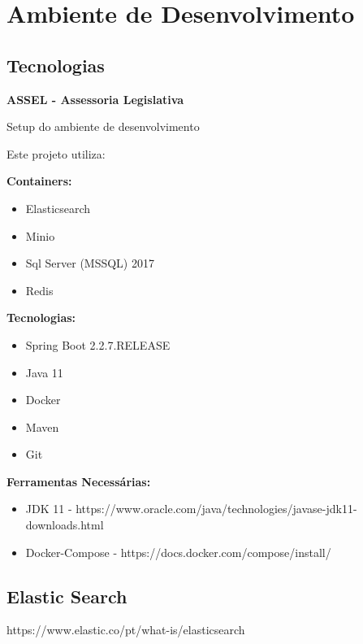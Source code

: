 \chapter{Ambiente de Desenvolvimento}

\section{Tecnologias}

\textbf{ASSEL - Assessoria Legislativa}

Setup do ambiente de desenvolvimento

Este projeto utiliza:

\textbf{Containers:}

\begin{itemize}
	\item Elasticsearch
	\item Minio
	\item Sql Server (MSSQL) 2017
	\item Redis
\end{itemize}



\textbf{Tecnologias:}

\begin{itemize}
	\item Spring Boot 2.2.7.RELEASE
	\item Java 11
	\item Docker
	\item Maven
	\item Git
\end{itemize}


\textbf{Ferramentas Necessárias:}

\begin{itemize}
	\item JDK 11 - https://www.oracle.com/java/technologies/javase-jdk11-downloads.html
	\item Docker-Compose - https://docs.docker.com/compose/install/
\end{itemize}


\section{Elastic Search}

https://www.elastic.co/pt/what-is/elasticsearch


